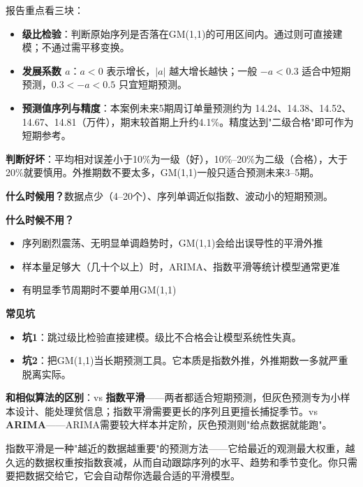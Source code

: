 \begin{algoresult}
报告重点看三块：

\begin{itemize}
    \item \textbf{级比检验}：判断原始序列是否落在GM(1,1)的可用区间内。通过则可直接建模；不通过需平移变换。
    \item \textbf{发展系数 $a$}：$a<0$ 表示增长，$|a|$ 越大增长越快；一般 $-a<0.3$ 适合中短期预测，$0.3<-a<0.5$ 只宜短期预测。
    \item \textbf{预测值序列与精度}：本案例未来5期周订单量预测约为 14.24、14.38、14.52、14.67、14.81（万件），期末较首期上升约4.1\%。精度达到"二级合格"即可作为短期参考。
\end{itemize}

\textbf{判断好坏}：平均相对误差小于10\%为一级（好），10\%--20\%为二级（合格），大于20\%就要慎用。外推期数不要太多，GM(1,1)一般只适合预测未来3--5期。
\end{algoresult}

\begin{algonotes}
\textbf{什么时候用？}数据点少（4--20个）、序列单调近似指数、波动小的短期预测。

\textbf{什么时候不用？}
\begin{itemize}
    \item 序列剧烈震荡、无明显单调趋势时，GM(1,1)会给出误导性的平滑外推
    \item 样本量足够大（几十个以上）时，ARIMA、指数平滑等统计模型通常更准
    \item 有明显季节周期时不要单用GM(1,1)
\end{itemize}

\textbf{常见坑}
\begin{itemize}
    \item \textbf{坑1}：跳过级比检验直接建模。级比不合格会让模型系统性失真。
    \item \textbf{坑2}：把GM(1,1)当长期预测工具。它本质是指数外推，外推期数一多就严重脱离实际。
\end{itemize}

\textbf{和相似算法的区别}：vs \textbf{指数平滑}——两者都适合短期预测，但灰色预测专为小样本设计、能处理贫信息；指数平滑需要更长的序列且更擅长捕捉季节。vs \textbf{ARIMA}——ARIMA需要较大样本并定阶，灰色预测则"给点数据就能跑"。
\end{algonotes}


\begin{algointro}
指数平滑是一种"越近的数据越重要"的预测方法——它给最近的观测最大权重，越久远的数据权重按指数衰减，从而自动跟踪序列的水平、趋势和季节变化。你只需要把数据交给它，它会自动帮你选最合适的平滑模型。
\end{algointro}

